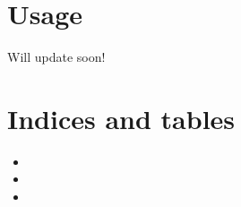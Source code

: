 \documentclass[letterpaper,10pt,english]{sphinxmanual}
\begin{document}
\chapter{Usage}
\label{\detokenize{Usage:usage}}\label{\detokenize{Usage::doc}}
Will update soon!


\chapter{Indices and tables}
\label{\detokenize{index:indices-and-tables}}\begin{itemize}
\item {} 

\item {} 

\item {} 

\end{itemize}



\renewcommand{\indexname}{Index}
\printindex
\end{document}

